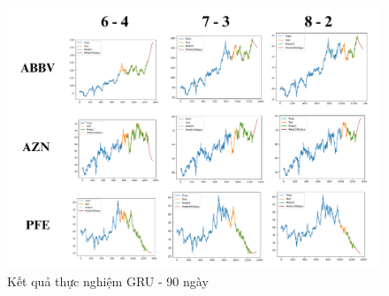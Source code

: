 \documentclass[conference]{IEEEtran}
\begin{document}
\vspace{-20pt}
\begin{figure}[H]
    \centering
    \begin{minipage}{0.5\textwidth}
    \centering
    \includegraphics[width=1\textwidth]{Image/GRU90.png}
    \caption{Kết quả thực nghiệm GRU - 90 ngày}
    \label{fig:1}
    \end{minipage}
\end{figure}
\end{document}
